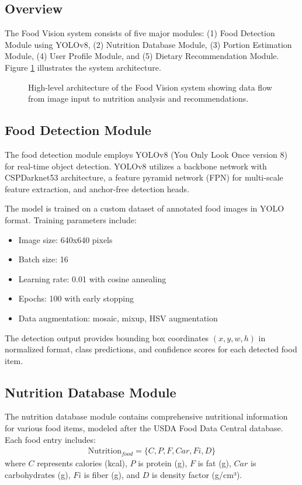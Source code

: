 \documentclass[conference]{IEEEtran}
\begin{document}
\subsection{Overview}
The Food Vision system consists of five major modules: (1) Food Detection Module using YOLOv8, (2) Nutrition Database Module, (3) Portion Estimation Module, (4) User Profile Module, and (5) Dietary Recommendation Module. Figure \ref{fig:architecture} illustrates the system architecture.

\begin{figure}[!t]
\centering
{}
\caption{High-level architecture of the Food Vision system showing data flow from image input to nutrition analysis and recommendations.}
\label{fig:architecture}
\end{figure}

\subsection{Food Detection Module}
The food detection module employs YOLOv8 (You Only Look Once version 8) for real-time object detection. YOLOv8 utilizes a backbone network with CSPDarknet53 architecture, a feature pyramid network (FPN) for multi-scale feature extraction, and anchor-free detection heads.

The model is trained on a custom dataset of annotated food images in YOLO format. Training parameters include:
\begin{itemize}
    \item Image size: 640x640 pixels
    \item Batch size: 16
    \item Learning rate: 0.01 with cosine annealing
    \item Epochs: 100 with early stopping
    \item Data augmentation: mosaic, mixup, HSV augmentation
\end{itemize}

The detection output provides bounding box coordinates $(x, y, w, h)$ in normalized format, class predictions, and confidence scores for each detected food item.

\subsection{Nutrition Database Module}
The nutrition database module contains comprehensive nutritional information for various food items, modeled after the USDA Food Data Central database. Each food entry includes:
\begin{align}
\text{Nutrition}_{food} = \{C, P, F, Car, Fi, D\}
\end{align}
where $C$ represents calories (kcal), $P$ is protein (g), $F$ is fat (g), $Car$ is carbohydrates (g), $Fi$ is fiber (g), and $D$ is density factor (g/cm³).
\end{document}
